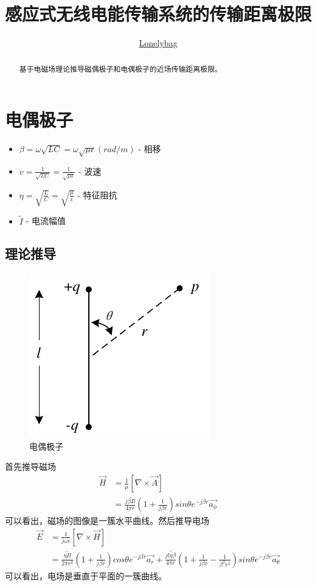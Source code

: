 \documentclass[lang=cn,11pt]{elegantpaper}
\title{感应式无线电能传输系统的传输距离极限}
\author{\href{https://gitee.com/lonelybag/personal-doc/}{Lonelybag}}
\date{}
\begin{document}
\maketitle

\begin{abstract}
基于电磁场理论推导磁偶极子和电偶极子的近场传输距离极限。
\end{abstract}

\section{电偶极子}
\begin{itemize}
  \item $\beta=\omega\sqrt{LC}=\omega\sqrt{\mu\epsilon}(rad/m)$ - 相移
  \item $v=\frac{1}{\sqrt{LC}}=\frac{1}{\sqrt{\mu \epsilon}}$ - 波速
  \item $\eta=\sqrt{\frac{L}{C}}=\sqrt{\frac{\mu}{\epsilon}}$ - 特征阻抗
  \item $\widetilde{I}$ - 电流幅值
\end{itemize}
\subsection{理论推导}
\begin{figure}[ht]
  \centering
  \includegraphics[width=0.3\linewidth]{figure//Hertzian_Dipole.pdf}
  \vspace{-0.3cm}
  \caption{电偶极子}\label{fig:Hertazian_Dipole}
\end{figure}
首先推导磁场
\begin{equation}
  \begin{aligned}
    \vec{H} &= \frac{1}{\mu}\left[\nabla\times \vec{A} \right] \\
            & = \frac{j\beta \widetilde{I}l}{4\pi r}\left(1 + \frac{1}{j\beta r}\right)sin \theta {} e^{-j\beta r} \vec{a_{\phi}}
\end{aligned}
\end{equation}
可以看出，磁场的图像是一簇水平曲线。然后推导电场
\begin{equation}
  \begin{aligned}
    \vec{E} &= \frac{1}{j\omega \epsilon}\left[\nabla \times \vec{H}\right] \\
    &= \frac{\eta \widetilde{I}l}{2\pi r^2}\left(1 + \frac{1}{j\beta r} \right)cos\theta e^{-j\beta r}\vec{a_r}+\frac{j\widetilde{l\eta \beta}}{4\pi r}\left(1+\frac{1}{j\beta r} - \frac{1}{{\beta}^2r^2}\right)sin\theta e^{-j\beta r}\vec{a_{\theta}}
  \end{aligned}
\end{equation}
可以看出，电场是垂直于平面的一簇曲线。
\end{document}
